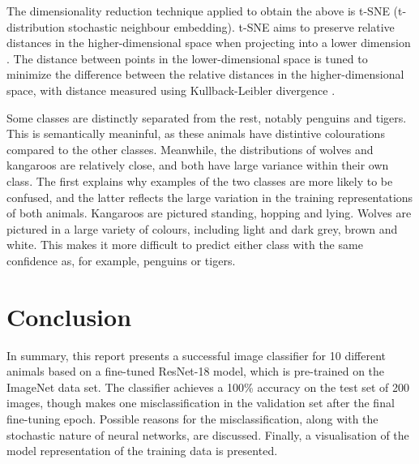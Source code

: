 The dimensionality reduction technique applied to obtain the above is t-SNE (t-distribution stochastic neighbour embedding). t-SNE aims to preserve relative distances in the higher-dimensional space when projecting into a lower dimension \cite{serebryakov_2020}. The distance between points in the lower-dimensional space is tuned to minimize the difference between the relative distances in the higher-dimensional space, with distance measured using Kullback-Leibler divergence \cite{serebryakov_2020}.

Some classes are distinctly separated from the rest, notably penguins and tigers. This is semantically meaninful, as these animals have distintive colourations compared to the other classes. Meanwhile, the distributions of wolves and kangaroos are relatively close, and both have large variance within their own class. The first explains why examples of the two classes are more likely to be confused, and the latter reflects the large variation in the training representations of both animals. Kangaroos are pictured standing, hopping and lying. Wolves are pictured in a large variety of colours, including light and dark grey, brown and white. This makes it more difficult to predict either class with the same confidence as, for example, penguins or tigers.

\section{Conclusion}

In summary, this report presents a successful image classifier for 10 different animals based on a fine-tuned ResNet-18 model, which is pre-trained on the ImageNet data set. The classifier achieves a 100\% accuracy on the test set of 200 images, though makes one misclassification in the validation set after the final fine-tuning epoch. Possible reasons for the misclassification, along with the stochastic nature of neural networks, are discussed. Finally, a visualisation of the model representation of the training data is presented.
